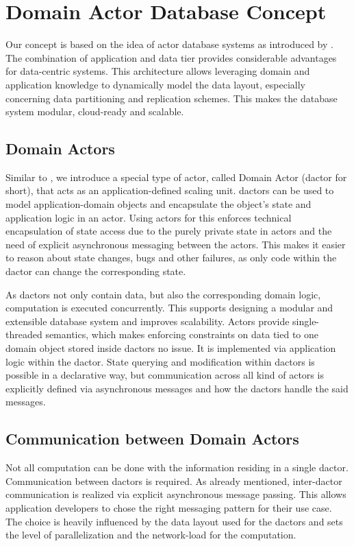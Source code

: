 
\section{Domain Actor Database Concept}\label{sec:concept}
  Our concept is based on the idea of actor database systems as introduced by \citet{manifesto}.
  The combination of application and data tier provides considerable advantages for data-centric systems.
  This architecture allows leveraging domain and application knowledge to dynamically model the data layout, especially concerning data partitioning and replication schemes.
  This makes the database system modular, cloud-ready and scalable.

  \subsection{Domain Actors}\label{sec:dactors}
    Similar to \citet{Shah:reactdb}, we introduce a special type of actor, called Domain Actor (\gls{dactor} for short), that acts as an application-defined scaling unit.
    \Glspl{dactor} can be used to model application-domain objects and encapsulate the object's state and application logic in an actor.
    Using actors for this enforces technical encapsulation of state access due to the purely private state in actors and the need of explicit asynchronous messaging between the actors.
    This makes it easier to reason about state changes, bugs and other failures, as only code within the \gls{dactor} can change the corresponding state.

    As \glspl{dactor} not only contain data, but also the corresponding domain logic, computation is executed concurrently.
    This supports designing a modular and extensible database system and improves scalability.
    Actors provide single-threaded semantics, which makes enforcing constraints on data tied to one domain object stored inside \glspl{dactor} no issue.
    It is implemented via application logic within the \gls{dactor}.
    State querying and modification within \glspl{dactor} is possible in a declarative way, but communication across all kind of actors is explicitly defined via asynchronous messages and how the \glspl{dactor} handle the said messages.

  \subsection{Communication between Domain Actors}
    Not all computation can be done with the information residing in a single \gls{dactor}.
    Communication between \glspl{dactor} is required.
    As already mentioned, inter-\gls{dactor} communication is realized via explicit asynchronous message passing.
    This allows application developers to chose the right messaging pattern for their use case.
    The choice is heavily influenced by the data layout used for the \glspl{dactor} and sets the level of parallelization and the network-load for the computation.

